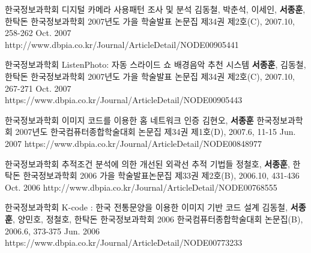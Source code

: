 \begin{cventries}
  \cvpublicationentry
    {한국정보과학회} %
    {디지털 카메라 사용패턴 조사 및 분석} %
    {김동철, 박춘석, 이세인, \textbf{서종훈}, 한탁돈} %
    {한국정보과학회 2007년도 가을 학술발표 논문집 제34권 제2호(C), 2007.10, 258-262}
    {Oct. 2007} %
    {http://www.dbpia.co.kr/Journal/ArticleDetail/NODE00905441}

  \cvpublicationentry
    {한국정보과학회} %
    {ListenPhoto: 자동 스라이드 쇼 배경음악 추천 시스템} %
    {\textbf{서종훈}, 김동철, 한탁돈} %
    {한국정보과학회 2007년도 가을 학술발표 논문집 제34권 제2호(C), 2007.10, 267-271}
    {Oct. 2007} %
    {https://www.dbpia.co.kr/Journal/ArticleDetail/NODE00905443}

  \cvpublicationentry
    {한국정보과학회} %
    {이미지 코드를 이용한 홈 네트워크 인증} %
    {김현오, \textbf{서종훈}} %
    {한국정보과학회 2007년도 한국컴퓨터종합학술대회 논문집 제34권 제1호(D), 2007.6, 11-15}
    {Jun. 2007} %
    {https://www.dbpia.co.kr/Journal/ArticleDetail/NODE00848977}

  \cvpublicationentry
    {한국정보과학회} %
    {추적조건 분석에 의한 개선된 외곽선 추적 기법들} %
    {정철호, \textbf{서종훈}, 한탁돈} %
    {한국정보과학회 2006 가을 학술발표논문집 제33권 제2호(B), 2006.10, 431-436}
    {Oct. 2006} %
    {http://www.dbpia.co.kr/Journal/ArticleDetail/NODE00768555}

  \cvpublicationentry
    {한국정보과학회} %
    {K-code : 한국 전통문양을 이용한 이미지 기반 코드 설계} %
    {김동철, \textbf{서종훈}, 양민호, 정철호, 한탁돈} %
    {한국정보과학회 2006 한국컴퓨터종합학술대회 논문집(B), 2006.6, 373-375}
    {Jun. 2006} %
    {https://www.dbpia.co.kr/Journal/ArticleDetail/NODE00773233}
\end{cventries}

